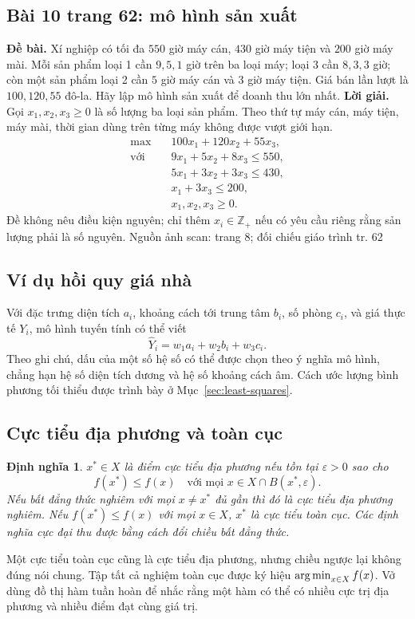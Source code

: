 \documentclass[11pt,a4paper]{article}
\newcommand{\src}[1]{\hfill{\footnotesize\color{gray}Nguồn ảnh scan: trang #1}}
\newcommand{\argmin}{\mathop{\rm arg\,min}}
\newtheorem{definition}{Định nghĩa}
\begin{document}
\subsection{Bài 10 trang 62: mô hình sản xuất}
\textbf{Đề bài.} Xí nghiệp có tối đa \(550\) giờ máy cán, \(430\) giờ máy tiện và \(200\) giờ máy mài. Mỗi sản phẩm loại 1 cần \(9,5,1\) giờ trên ba loại máy; loại 3 cần \(8,3,3\) giờ; còn một sản phẩm loại 2 cần \(5\) giờ máy cán và \(3\) giờ máy tiện. Giá bán lần lượt là \(100,120,55\) đô-la. Hãy lập mô hình sản xuất để doanh thu lớn nhất.
\textbf{Lời giải.} Gọi \(x_1,x_2,x_3\ge0\) là số lượng ba loại sản phẩm. Theo thứ tự máy cán, máy tiện, máy mài, thời gian dùng trên từng máy không được vượt giới hạn.
\[
\begin{aligned}
\max\quad &100x_1+120x_2+55x_3,\\
\text{với}\quad
&9x_1+5x_2+8x_3\le550,\\
&5x_1+3x_2+3x_3\le430,\\
&x_1+3x_3\le200,\\
&x_1,x_2,x_3\ge0.
\end{aligned}
\]
Đề không nêu điều kiện nguyên; chỉ thêm \(x_i\in\mathbb{Z}_+\) nếu có yêu cầu riêng rằng sản lượng phải là số nguyên.
\src{8; đối chiếu giáo trình tr. 62}

\subsection{Ví dụ hồi quy giá nhà}
Với đặc trưng diện tích \(a_i\), khoảng cách tới trung tâm \(b_i\), số phòng \(c_i\), và giá thực tế \(Y_i\), mô hình tuyến tính có thể viết
\[
\widehat Y_i=w_1a_i+w_2b_i+w_3c_i.
\]
Theo ghi chú, dấu của một số hệ số có thể được chọn theo ý nghĩa mô hình, chẳng hạn hệ số diện tích dương và hệ số khoảng cách âm. Cách ước lượng bình phương tối thiểu được trình bày ở Mục~\ref{sec:least-squares}.

\subsection{Cực tiểu địa phương và toàn cục}
\begin{definition}
\(x^*\in X\) là điểm cực tiểu địa phương nếu tồn tại \(\varepsilon>0\) sao cho
\[
f(x^*)\le f(x)\quad
\text{với mọi }x\in X\cap B(x^*,\varepsilon).
\]
Nếu bất đẳng thức nghiêm với mọi \(x\ne x^*\) đủ gần thì đó là cực tiểu địa phương nghiêm. Nếu \(f(x^*)\le f(x)\) với mọi \(x\in X\), \(x^*\) là cực tiểu toàn cục. Các định nghĩa cực đại thu được bằng cách đổi chiều bất đẳng thức.
\end{definition}
Một cực tiểu toàn cục cũng là cực tiểu địa phương, nhưng chiều ngược lại không đúng nói chung. Tập tất cả nghiệm toàn cục được ký hiệu \(\argmin_{x\in X}f(x)\). Vở dùng đồ thị hàm tuần hoàn để nhắc rằng một hàm có thể có nhiều cực trị địa phương và nhiều điểm đạt cùng giá trị.
\end{document}

